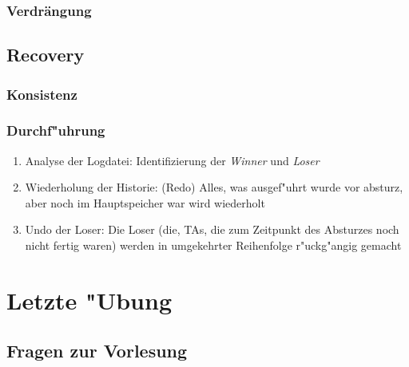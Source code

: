 \documentclass[a4paper, 12pt]{scrartcl}
\begin{document}
\subsubsection{Verdrängung}
\subsection{Recovery}
\subsubsection{Konsistenz}
\subsubsection{Durchf"uhrung}
\begin{enumerate}
	\item
		Analyse der Logdatei: Identifizierung der \emph{Winner} und \emph{Loser}
	\item
		Wiederholung der Historie: (Redo) Alles, was ausgef"uhrt wurde vor absturz, aber noch im Hauptspeicher war wird wiederholt
	\item
		Undo der Loser: Die Loser (die, TAs, die zum Zeitpunkt des Absturzes noch nicht fertig waren) werden in umgekehrter Reihenfolge r"uckg"angig gemacht
\end{enumerate}

\section{Letzte "Ubung}
\subsection{Fragen zur Vorlesung}
\end{document}
